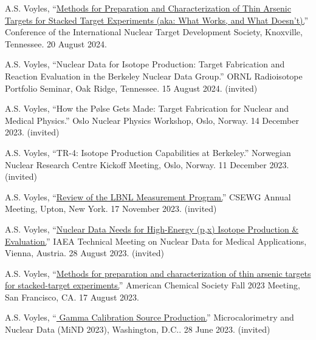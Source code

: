 \begin{bibsection}

\item A.S. Voyles, \enquote{\href{https://intds2024.ornl.gov/}{Methods for Preparation and Characterization of Thin Arsenic Targets for Stacked Target Experiments (aka:  What Works, and What Doesn’t).}}  Conference of the International Nuclear Target Development Society, Knoxville, Tennessee. 20 August 2024.

\item A.S. Voyles, \enquote{Nuclear Data for Isotope Production: Target Fabrication and Reaction Evaluation in the Berkeley Nuclear Data Group.} ORNL Radioisotope Portfolio Seminar, Oak Ridge, Tennessee. 15 August 2024. (invited)

\item A.S. Voyles, \enquote{How the Pølse Gets Made: Target Fabrication for Nuclear and Medical Physics.} Oslo Nuclear Physics Workshop, Oslo, Norway. 14 December 2023. (invited)

\item A.S. Voyles, \enquote{TR-4: Isotope Production Capabilities at Berkeley.} Norwegian Nuclear Research Centre Kickoff Meeting, Oslo, Norway. 11 December 2023. (invited)

\item A.S. Voyles, \enquote{\href{https://indico.bnl.gov/event/18701/}{Review of the LBNL Measurement Program.}} CSEWG Annual Meeting, Upton, New York. 17 November 2023. (invited)


\item A.S. Voyles, \enquote{\href{https://nds.iaea.org/publications/indc/indc-nds-0884/}{Nuclear Data Needs for High-Energy (p,x) Isotope Production \& Evaluation.}} IAEA Technical Meeting on Nuclear Data for Medical Applications, Vienna, Austria. 28 August 2023. (invited)

\item A.S. Voyles, \enquote{\href{https://acs.digitellinc.com/sessions/583121/view}{Methods for preparation and characterization of thin arsenic targets for stacked-target experiments.}} American Chemical Society Fall 2023 Meeting, San Francisco, CA. 17 August 2023. 

\item A.S. Voyles, \enquote{\href{https://conferences.lbl.gov/event/1243/contributions/7407/}{ Gamma Calibration Source Production.}} Microcalorimetry and Nuclear Data (MiND 2023), Washington, D.C.. 28 June 2023. (invited)


\end{bibsection}
